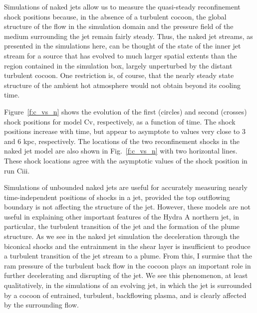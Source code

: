 Simulations of naked jets allow us to measure the quasi-steady reconfinement shock positions because, in the absence of a turbulent cocoon, the global structure of the flow in the simulation domain and the pressure field of the medium surrounding the jet remain fairly steady. Thus, the naked jet streams, as presented in the simulations here, can be thought of the state of the inner jet stream for a source that has evolved to much larger spatial extents than the region contained in the simulation box, largely unperturbed by the distant turbulent cocoon. One restriction is, of course, that the nearly steady state structure of the ambient hot atmosphere would not obtain beyond its cooling time.

Figure~\ref{f:c_vs_n} shows the evolution of the first (circles) and second (crosses) shock positions for model Cv, respectively, as a function of time. The shock positions increase with time, but appear to asymptote to values very close to 3 and 6 kpc, respectively. The locations of the two reconfinement shocks in the naked jet model are also shown in Fig.~\ref{f:c_vs_n} with two horizontal lines. These shock locations agree with the asymptotic values of the shock position in run Ciii. 


Simulations of unbounded naked jets are useful for accurately measuring nearly time-independent positions of shocks in a jet, provided the top outflowing boundary is not affecting the structure of the jet. However, these models are not useful in explaining other important features of the Hydra A northern jet, in particular, the turbulent transition of the jet and the formation of the plume structure. As we see in the naked jet simulation the deceleration through the biconical shocks and the entrainment in the shear layer is insufficient to produce a turbulent transition of the jet stream to a plume. From this, I surmise that the ram pressure of the turbulent back flow in the cocoon plays an important role in further decelerating and disrupting of the jet. We see this phenomenon, at least qualitatively, in the simulations of an evolving jet, in which the jet is surrounded by a cocoon of entrained, turbulent, backflowing plasma, and is clearly affected by the surrounding flow. 

